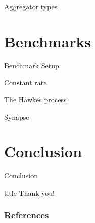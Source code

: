 \documentclass[
  ignorenonframetext,
  aspectratio=169,
  xcolor={dvipsnames,rgb}
]{beamer}
\begin{document}




\begin{frame}{Aggregator types}
\end{frame}

\hypertarget{benchmarks}{\section{Benchmarks}\label{benchmarks}}

\begin{frame}{Benchmark Setup}
\end{frame}

\begin{frame}{Constant rate}
\end{frame}

\begin{frame}{The Hawkes process}
\end{frame}

\begin{frame}{Synapse}
\end{frame}

\hypertarget{conclusion}{\section{Conclusion}\label{conclusion}}

\begin{frame}{Conclusion}
\end{frame}

\begin{frame}
  \thispagestyle{empty@titlepage}
  \begingroup
    \begin{beamercolorbox}[sep=8pt,center]{title}%
      {Thank you!}%
    \end{beamercolorbox}
  \endgroup
\end{frame}

\begin{frame}[t,allowframebreaks]
  \frametitle{References}
  \printbibliography[heading=none]
\end{frame}
\end{document}
